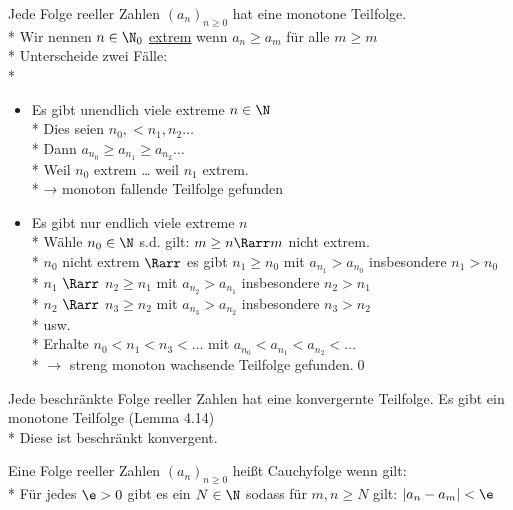 Jede Folge reeller Zahlen $(a_n)_{n\geq 0}$ hat eine monotone Teilfolge.\\*
%
\bew
Wir nennen $n\in \N_0$ \underline{extrem} wenn $a_n \geq a_m$ für alle $m \geq m$\\*
Unterscheide zwei Fälle:\\*
\begin{itemize}
    \item{Es gibt unendlich viele extreme $n \in \N$\\*
Dies seien $n_0, < n_1, n_2…$\\*
Dann $a_{n_0} \geq a_{n_1} \geq a_{n_2} …$\\*
Weil $n_0$ extrem … weil $n_1$ extrem.\\*
→ monoton fallende Teilfolge gefunden}
    \item{Es gibt nur endlich viele extreme $n$\\*
Wähle $n_0 \in \N$ s.d. gilt: $m \geq n \Rarr m$ nicht extrem.\\*
$n_0$ nicht extrem $\Rarr$ es gibt $n_1 \geq n_0$ mit $a_{n_1} > a_{n_0}$ insbesondere $n_1 > n_0$\\*
$n_1$ \phantom{nicht extrem }$\Rarr$ \phantom{es gibt }$n_2 \geq n_1$ mit $a_{n_2} > a_{n_1}$ insbesondere $n_2 > n_1$\\*
$n_2$ \phantom{nicht extrem }$\Rarr$ \phantom{es gibt }$n_3 \geq n_2$ mit $a_{n_3} > a_{n_2}$ insbesondere $n_3 > n_2$\\*
usw.\\*
Erhalte $n_0 < n_1 < n_3 < …$ mit $a_{n_0} < a_{n_1} < a_{n_2} < …$ \\*
$\to $ streng monoton wachsende Teilfolge gefunden.\qed
}
\end{itemize}

Jede beschränkte Folge reeller Zahlen hat eine konvergernte Teilfolge.
\bew
Es gibt ein monotone Teilfolge (Lemma 4.14)\\*
Diese ist beschränkt \Rarr konvergent.

Eine Folge reeller Zahlen $(a_n)_{n \geq 0}$ heißt Cauchyfolge wenn gilt:\\*
Für jedes $\e > 0$ gibt es ein $N \in \N$ sodass für $m, n \geq N$ gilt: $|a_n - a_m| < \e$

